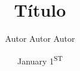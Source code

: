 \documentclass{ASD_LaTeX}
\author{Autor Autor Autor}
\title{Título}
\date{January 1\textsuperscript{ST}}
\begin{document}

    \biblio
\end{document}

